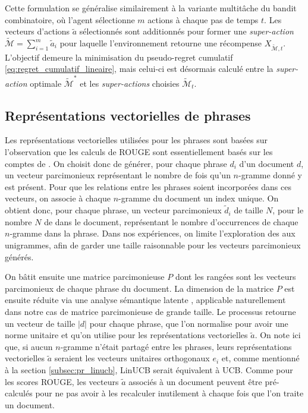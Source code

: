 Cette formulation se généralise similairement à la 
variante multitâche du bandit combinatoire, où l'agent 
sélectionne $m$ actions à chaque pas de temps $t$.
Les vecteurs d'actions $\tilde{a}$ sélectionnés sont
additionnés pour former une \textit{super-action} $\tilde{\mathcal{M}} = \sum_{i=1}^m \tilde{a}_i$
pour laquelle l'environnement retourne une récompense $X_{\tilde{\mathcal{M}}, t}$.
L'objectif demeure la minimisation du pseudo-regret cumulatif \eqref{eq:regret_cumulatif_lineaire}, 
mais celui-ci est désormais calculé entre
la \textit{super-action} optimale $\tilde{\mathcal{M}}^*$ et les \textit{super-actions}
choisies $\tilde{\mathcal{M}}_t$.

\subsection{Représentations vectorielles de phrases}

Les représentations vectorielles utilisées pour les phrases sont basées sur l'observation
que les calculs de ROUGE sont essentiellement basés sur les comptes de \ngrams.
On choisit donc de générer, pour chaque phrase $d_i$ d'un document $d$, un vecteur parcimonieux
représentant le nombre de fois qu'un $n$-gramme donné y est présent.
Pour que les relations entre les phrases soient incorporées dans ces vecteurs,
on associe à chaque $n$-gramme du document un index unique.
On obtient donc, pour chaque phrase, un vecteur parcimonieux $\tilde{d}_i$ de taille $N$,
pour le nombre $N$ de \ngrams dans le document, représentant le 
nombre d'occurrences de chaque $n$-gramme dans la phrase.
Dans nos expériences, on limite l'exploration des \ngrams aux unigrammes,
afin de garder une taille raisonnable pour les vecteurs parcimonieux générés.

On bâtit ensuite une matrice parcimonieuse $P$ dont les rangées sont les vecteurs parcimonieux 
de chaque phrase du document.
La dimension de la matrice $P$ est ensuite réduite via une analyse sémantique latente \citep{10.1145/291128.291131}, 
applicable naturellement dans notre cas de matrice parcimonieuse de grande taille.
Le processus retourne un vecteur de taille $|d|$ pour chaque phrase, que l'on normalise pour avoir 
une norme unitaire et qu'on utilise pour les 
représentations vectorielles $\tilde{a}$.
On note ici que, si aucun $n$-gramme n'était partagé entre les phrases,
leurs représentations vectorielles $\tilde{a}$ seraient
les vecteurs unitaires orthogonaux $e_i$ et, 
comme mentionné à la section \ref{subsec:pr_linucb}, LinUCB serait équivalent à UCB.
Comme pour les scores ROUGE, les vecteurs $\tilde{a}$ associés à un document peuvent 
être pré-calculés pour ne pas avoir à les recalculer inutilement à chaque fois 
que l'on traite un document.

